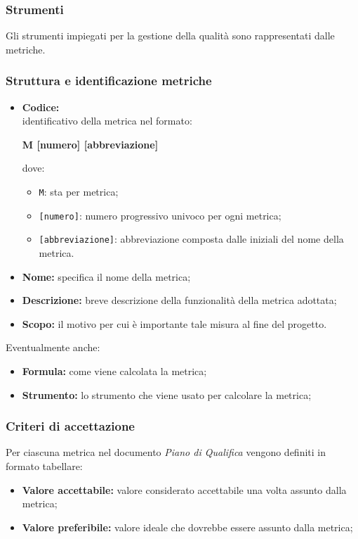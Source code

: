 \subsubsection{Strumenti}
Gli strumenti impiegati per la gestione della qualità sono rappresentati dalle metriche.

\subsubsection{Struttura e identificazione metriche}
\begin{itemize}
    \item \textbf{Codice:} \\
    identificativo della metrica nel formato:
        \begin{center}
            \textbf{M [numero] [abbreviazione]}
        \end{center}
        dove:
        \begin{itemize}
            \item \texttt{M}: sta per metrica;
            \item \texttt{[numero]}: numero progressivo univoco per ogni metrica;
            \item \texttt{[abbreviazione]}: abbreviazione composta dalle iniziali del nome della metrica.
        \end{itemize}
    \item \textbf{Nome:} specifica il nome della metrica;
    \item \textbf{Descrizione:} breve descrizione della funzionalità della metrica adottata;
    \item \textbf{Scopo:} il motivo per cui è importante tale misura al fine del progetto.
\end{itemize}
    \vspace{0.2cm}
Eventualmente anche:
\begin{itemize}
    \item \textbf{Formula:} come viene calcolata la metrica;
    \item \textbf{Strumento:} lo strumento che viene usato per calcolare la metrica;
\end{itemize}

\subsubsection{Criteri di accettazione}
Per ciascuna metrica nel documento \textit{Piano di Qualifica} vengono definiti in formato tabellare:
\begin{itemize}
    \item \textbf{Valore accettabile:} valore considerato accettabile una volta assunto dalla metrica;
    \item \textbf{Valore preferibile:} valore ideale che dovrebbe essere assunto dalla metrica;
\end{itemize}

